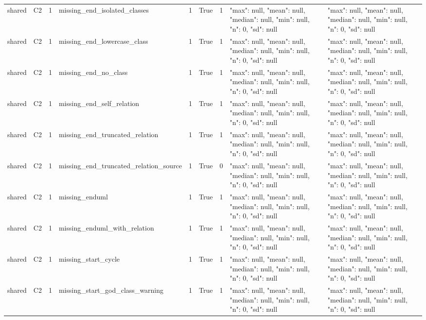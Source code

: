 \begin{tabular}{lllllllll}
shared & C2 & 1 & missing\_end\_isolated\_classes & 1 & True & 1 & {"max": null, "mean": null, "median": null, "min": null, "n": 0, "sd": null} & {"max": null, "mean": null, "median": null, "min": null, "n": 0, "sd": null} \\
shared & C2 & 1 & missing\_end\_lowercase\_class & 1 & True & 1 & {"max": null, "mean": null, "median": null, "min": null, "n": 0, "sd": null} & {"max": null, "mean": null, "median": null, "min": null, "n": 0, "sd": null} \\
shared & C2 & 1 & missing\_end\_no\_class & 1 & True & 1 & {"max": null, "mean": null, "median": null, "min": null, "n": 0, "sd": null} & {"max": null, "mean": null, "median": null, "min": null, "n": 0, "sd": null} \\
shared & C2 & 1 & missing\_end\_self\_relation & 1 & True & 1 & {"max": null, "mean": null, "median": null, "min": null, "n": 0, "sd": null} & {"max": null, "mean": null, "median": null, "min": null, "n": 0, "sd": null} \\
shared & C2 & 1 & missing\_end\_truncated\_relation & 1 & True & 1 & {"max": null, "mean": null, "median": null, "min": null, "n": 0, "sd": null} & {"max": null, "mean": null, "median": null, "min": null, "n": 0, "sd": null} \\
shared & C2 & 1 & missing\_end\_truncated\_relation\_source & 1 & True & 0 & {"max": null, "mean": null, "median": null, "min": null, "n": 0, "sd": null} & {"max": null, "mean": null, "median": null, "min": null, "n": 0, "sd": null} \\
shared & C2 & 1 & missing\_enduml & 1 & True & 1 & {"max": null, "mean": null, "median": null, "min": null, "n": 0, "sd": null} & {"max": null, "mean": null, "median": null, "min": null, "n": 0, "sd": null} \\
shared & C2 & 1 & missing\_enduml\_with\_relation & 1 & True & 1 & {"max": null, "mean": null, "median": null, "min": null, "n": 0, "sd": null} & {"max": null, "mean": null, "median": null, "min": null, "n": 0, "sd": null} \\
shared & C2 & 1 & missing\_start\_cycle & 1 & True & 1 & {"max": null, "mean": null, "median": null, "min": null, "n": 0, "sd": null} & {"max": null, "mean": null, "median": null, "min": null, "n": 0, "sd": null} \\
shared & C2 & 1 & missing\_start\_god\_class\_warning & 1 & True & 1 & {"max": null, "mean": null, "median": null, "min": null, "n": 0, "sd": null} & {"max": null, "mean": null, "median": null, "min": null, "n": 0, "sd": null} \\

\end{tabular}
